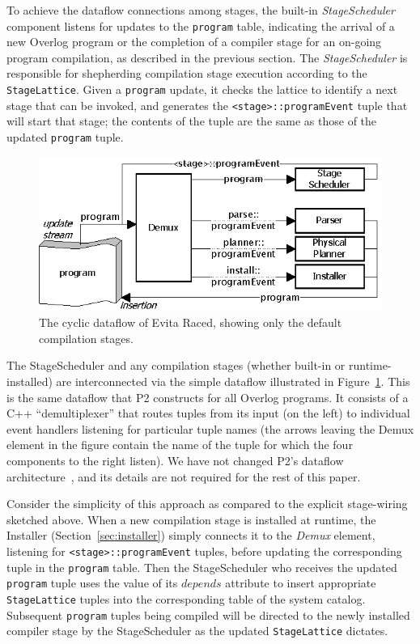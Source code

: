 \documentclass{sigmod08}
\newcommand{\ol}[1]{\texttt{\small #1}\xspace}
\begin{document}
To achieve the dataflow connections among stages, the built-in {\em
  StageScheduler} component listens for
updates to the \ol{program} table, indicating the arrival of a new
Overlog program or the completion of a compiler
stage for an on-going program compilation, as described in the previous section.  The {\em StageScheduler} is
responsible for shepherding compilation stage execution according to the
\ol{StageLattice}. Given a \ol{program} update, it checks the lattice to identify a next stage
that can be invoked, and generates the
\ol{<stage>::programEvent} tuple that will start that stage; the
contents of the tuple are the same as those of the updated
\ol{program} tuple.  

\begin{figure}[htbp]
\begin{center}
\includegraphics{visio/DefaultCompiler}
\caption{The cyclic dataflow of Evita Raced, showing only the default compilation stages.}
\label{fig:basecompiler}
\end{center}
\end{figure}

The StageScheduler and any compilation stages (whether built-in or
runtime-installed) are interconnected via the simple dataflow
illustrated in Figure~\ref{fig:basecompiler}. This is the same dataflow
that P2 constructs for all Overlog programs. It consists of a C++ ``demultiplexer'' that
routes tuples from its input (on the left) to individual event handlers listening for
particular tuple names (the arrows leaving the Demux element in the
figure contain the name of the tuple for which the four components to the
right listen).  We have not changed P2's dataflow architecture~\cite{loo-sosp05}, and its
details are not required for the rest of this paper.  

Consider the simplicity of this approach as compared to the explicit
stage-wiring  sketched above. When a new compilation stage is installed
at runtime, the Installer (Section~\ref{sec:installer})
simply connects it to the {\em Demux} element, listening for
\ol{<stage>::programEvent} tuples, before updating the corresponding
tuple in the \ol{program} table. 
Then the StageScheduler who receives the updated \ol{program} tuple uses
the value of its $depends$ attribute  to insert appropriate 
\ol{StageLattice} tuples into the corresponding table of the
system catalog. Subsequent \ol{program} tuples being compiled will be directed to
the newly installed compiler stage by the StageScheduler as the updated
\ol{StageLattice} dictates.
\end{document}
